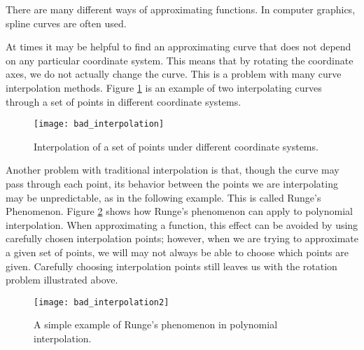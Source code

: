 \label{lab:bezier}


There are many different ways of approximating functions.
In computer graphics, spline curves are often used.

At times it may be helpful to find an approximating curve that does not depend on any particular coordinate system.
This means that by rotating the coordinate axes, we do not actually change the curve.
This is a problem with many curve interpolation methods.
Figure \ref{bezier:bad_interpolation} is an example of two interpolating curves through a set of points in different coordinate systems.

\begin{figure}
\texttt{[image: bad\_interpolation]}
\caption{Interpolation of a set of points under different coordinate systems.}
\label{bezier:bad_interpolation}
\end{figure}

Another problem with traditional interpolation is that, though the curve may pass through each point, its behavior between the points we are interpolating may be unpredictable, as in the following example.
This is called Runge's Phenomenon.
Figure \ref{bezier:bad_interpolation2} shows how Runge's phenomenon can apply to polynomial interpolation.
When approximating a function, this effect can be avoided by using carefully chosen interpolation points; however, when we are trying to approximate a given set of points, we will may not always be able to choose which points are given.
Carefully choosing interpolation points still leaves us with the rotation problem illustrated above.

\begin{figure}
\texttt{[image: bad\_interpolation2]}
\caption{A simple example of Runge's phenomenon in polynomial interpolation.}
\label{bezier:bad_interpolation2}
\end{figure}

